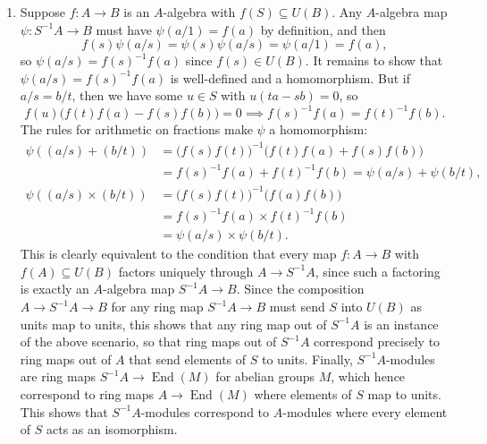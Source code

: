 \documentclass{report}
\DeclareMathOperator{\End}{End}
\begin{document}
\begin{enumerate}[label=\textbf{1.3.\Alph*.}]
	\item Suppose $f:A\to B$ is an $A$-algebra with $f(S)\subseteq U(B)$.
	      Any $A$-algebra map $\psi:S^{-1}A\to B$ must have $\psi(a/1)=f(a)$
	      by definition, and then
	      \begin{equation*}
		      f(s)\psi(a/s) = \psi(s)\psi(a/s) = \psi(a/1) = f(a),
	      \end{equation*}
	      so $\psi(a/s)=f(s)^{-1}f(a)$ since $f(s)\in U(B)$. It remains to show
	      that $\psi(a/s)=f(s)^{-1}f(a)$ is well-defined and a homomorphism.
	      But if $a/s=b/t$, then we have some $u\in S$ with $u(ta-sb)=0$,
	      so
	      \begin{equation*}
		      f(u)\bigl(f(t)f(a)-f(s)f(b)\bigr) = 0
		      \implies f(s)^{-1}f(a) = f(t)^{-1}f(b).
	      \end{equation*}
	      The rules for arithmetic on fractions make $\psi$ a homomorphism:
	      \begin{align*}
		      \psi((a/s) + (b/t))
		       & = \bigl(f(s)f(t)\bigr)^{-1}\bigl(f(t)f(a)+f(s)f(b)\bigr) \\
		       & = f(s)^{-1}f(a)+f(t)^{-1}f(b) = \psi(a/s) + \psi(b/t),   \\
		      \psi((a/s)\times(b/t))
		       & = \bigl(f(s)f(t)\bigr)^{-1}\bigl(f(a)f(b)\bigr)          \\
		       & = f(s)^{-1}f(a)\times f(t)^{-1}f(b)                      \\
		       & = \psi(a/s)\times\psi(b/t).
	      \end{align*}
	      This is clearly equivalent to the condition that every map $f:A\to B$
	      with $f(A)\subseteq U(B)$ factors uniquely through $A\to S^{-1}A$,
	      since such a factoring is exactly an $A$-algebra map $S^{-1}A\to B$.
	      Since the composition $A\to S^{-1}A\to B$ for any ring map
	      $S^{-1}A\to B$ must send $S$ into $U(B)$ as units map to units,
	      this shows that any ring map out of $S^{-1}A$ is an instance of the
	      above scenario, so that ring maps out of $S^{-1}A$ correspond
	      precisely to ring maps out of $A$ that send elements of $S$ to units.
	      Finally, $S^{-1}A$-modules are ring maps $S^{-1}A\to\End(M)$ for
	      abelian groups $M$, which hence correspond to ring maps $A\to\End(M)$
	      where elements of $S$ map to units. This shows that $S^{-1}A$-modules
	      correspond to $A$-modules where every element of $S$ acts as an
	      isomorphism.


\end{enumerate}
\end{document}
